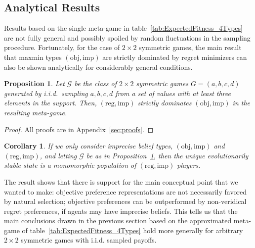 \documentclass[fleqn,reqno,12pt]{article}
\theoremstyle{Satz}
\newtheorem{proposition}{Proposition}
\newtheorem{corollary}{Corollary}
\theoremstyle{Bsp}
\begin{document}
\subsection{Analytical Results}
\label{sec:analytical-results}

Results based on the single meta-game in table~\ref{tab:ExpectedFitness_4Types} are not fully general and possibly spoiled by random
fluctuations in the sampling procedure. Fortunately, for the case of $2 \times 2$ symmetric
games, the main result that maxmin types $(\text{obj}, \text{imp})$ are strictly dominated by regret minimizers can
also be shown analytically for considerably general conditions.

\begin{proposition} \label{proposition1}
  Let $\mathcal{G}$ be the class of $2 \times 2$ symmetric games $G=(a,b,c,d)$ generated by i.i.d.~sampling $a,b,c,d$ from a
  set of values with at least three elements in the support. Then,
  $(\text{reg}, \text{imp})$ strictly dominates $(\text{obj}, \text{imp})$ in the resulting
  meta-game.
\end{proposition}

\begin{proof}
All proofs are in Appendix~\ref{sec:proofs}.
\end{proof}

\begin{corollary} \label{corollary1} If we only consider imprecise belief types, $(\text{obj}, \text{imp})$ and
  $(\text{reg}, \text{imp})$, and letting $\mathcal{G}$ be as in Proposition~\ref{proposition1}, then the unique evolutionarily stable state is a monomorphic population of
  $(\text{reg}, \text{imp})$ players.
\end{corollary}

The result shows that there is support for the main conceptual
point that we wanted to make: 
objective preference representations are not necessarily favored by natural selection;
objective preferences can be outperformed by non-veridical regret preferences, if agents may
have imprecise beliefs.  This tells us that the main conclusions drawn in the previous section
based on the approximated meta-game of table~\ref{tab:ExpectedFitness_4Types} hold more
generally for arbitrary $2 \times 2$ symmetric games with i.i.d. sampled payoffs.
\end{document}
